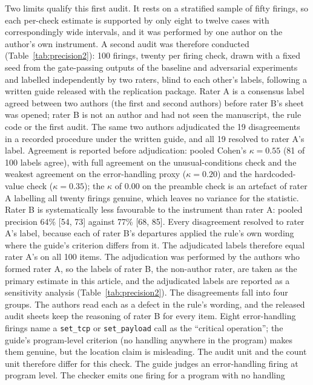 \documentclass{ieeeaccess}
\begin{document}
Two limits qualify this first audit. It rests on a stratified sample of fifty firings, so
each per-check estimate is supported by only eight to twelve cases with correspondingly
wide intervals, and it was performed by one author on the author's own instrument. A
second audit was therefore conducted (Table~\ref{tab:precision2}): 100
firings, twenty per firing check, drawn with a fixed seed from the gate-passing outputs of
the baseline and adversarial experiments and labelled independently by two raters, blind
to each other's labels, following a written guide released with the replication package.
Rater A is a consensus label agreed between two authors (the first and second authors)
before rater B's sheet was opened; rater B is not an author and had not seen the
manuscript, the rule code or the first audit. The same two authors adjudicated the 19
disagreements in a recorded procedure under the written guide, and all 19 resolved to
rater A's label. Agreement is reported before adjudication: pooled Cohen's
$\kappa=0.55$ (81 of 100 labels agree), with full agreement on the unusual-conditions
check and the weakest
agreement on the error-handling proxy ($\kappa=0.20$) and the hardcoded-value check
($\kappa=0.35$); the $\kappa$ of 0.00 on the preamble check is an artefact of rater A
labelling all twenty firings genuine, which leaves no variance for the statistic. Rater B
is systematically less favourable to the instrument than rater A: pooled precision 64\%
[54, 73] against 77\% [68, 85]. Every disagreement resolved to
rater A's label, because each of rater B's departures applied the rule's own wording
where the guide's criterion differs from it. The adjudicated labels therefore equal rater
A's on all 100 items. The adjudication was performed by the authors who formed rater A, so the labels of
rater B, the non-author rater, are taken as the primary estimate in this article, and the
adjudicated labels are reported as a sensitivity analysis (Table~\ref{tab:precision2}).
The disagreements fall into four groups. The authors read each
as a defect in the rule's wording, and the released audit sheets keep the reasoning of
rater B for every item. Eight
error-handling firings name a \texttt{set\_tcp} or \texttt{set\_payload} call as the
``critical operation''; the guide's program-level criterion (no handling anywhere in the
program) makes them genuine, but the location claim is misleading. The audit unit and the
count unit therefore differ for this check. The guide judges an error-handling firing at
program level. The checker emits one firing for a program with no handling
\end{document}
